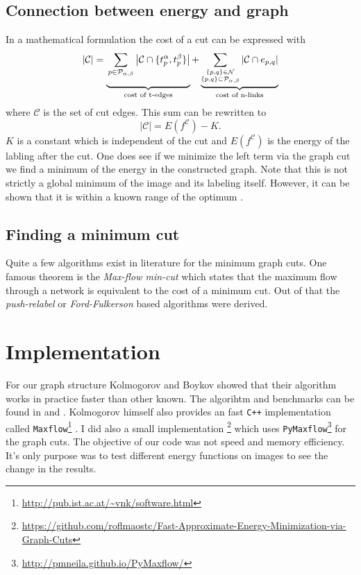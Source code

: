 \documentclass[runningheads,a4paper]{llncs}
\begin{document}
    \subsection{Connection between energy and graph}
        In a mathematical formulation the cost of a cut can be expressed with
        \begin{equation}
           |\mathcal{C}| = \underbrace{\rule[-7.75mm]{0mm}{0mm} \sum_{p \in \mathcal{P}_{\alpha,\beta}} \left| \mathcal{C} \cap \{t_p^\alpha,t_p^\beta \} \right|}_{\text{cost of t-edges}}+ \underbrace{\sum\limits_{\small \substack{ \{p,q\} \in \mathcal{N}\\ \{p,q \} \subset \mathcal{P}_{\alpha,\beta}}} |\mathcal{C} \cap e_{p,q}|}_{\text{cost of n-links}}
        \end{equation}
        where $\mathcal{C}$ is the set of cut edges. This sum can be rewritten to 
        \begin{equation}
            |\mathcal{C}| = E(f^\mathcal{C}) - K.
        \end{equation}
        $K$ is a constant which is independent of the cut and $E(f^\mathcal{C})$ is the energy of the labling after the cut. One does see if we minimize the left term via the graph cut we find a minimum of the energy in the constructed graph. Note that this is not strictly a global minimum of the image and its labeling itself. However, it can be shown that it is within a known range of the optimum \cite{vekslerefficient}.


    \subsection{Finding a minimum cut}
        Quite a few algorithms exist in literature for the minimum graph cuts.
        One famous theorem is the \textit{Max-flow min-cut} which states that the maximum flow through a network is equivalent to 
        the cost of a minimum cut. Out of that the \textit{push-relabel} or \textit{Ford-Fulkerson} based algorithms were derived. 

\section{Implementation}
        For our graph structure Kolmogorov and Boykov showed that their algorithm works
        in practice faster than other known. The algorihtm and benchmarks can be found in \cite{expcomp} and \cite{thesis}. Kolmogorov himself also provides an fast \texttt{C++} implementation called \texttt{Maxflow}\footnote{\url{http://pub.ist.ac.at/~vnk/software.html}} \cite{kolmin}.
        I did also a small implementation \footnote{\url{https://github.com/roflmaostc/Fast-Approximate-Energy-Minimization-via-Graph-Cuts}} which uses \texttt{PyMaxflow}\footnote{\url{http://pmneila.github.io/PyMaxflow/}} for the graph cuts.
        The objective of our code was not speed and memory efficiency. It's only purpose was to test different energy functions on images to see the change in the results.
\end{document}
